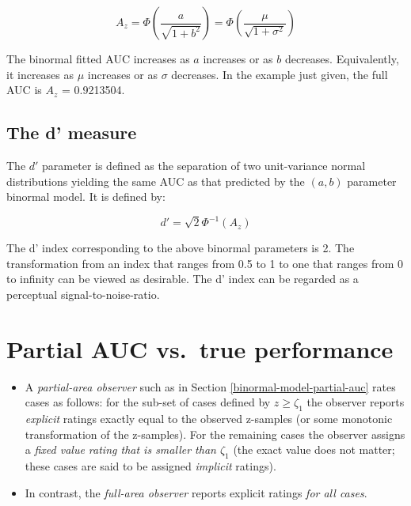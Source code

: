 \documentclass[
]{book}
\begin{document}
\begin{equation} 
A_z=\Phi\left ( \frac{a}{\sqrt{1+b^2}} \right )=\Phi\left ( \frac{\mu}{\sqrt{1+\sigma^2}} \right )
\label{eq:binormal-model-ab-2az}
\end{equation}

The binormal fitted AUC increases as \(a\) increases or as \(b\) decreases. Equivalently, it increases as \(\mu\) increases or as \(\sigma\) decreases. In the example just given, the full AUC is \(A_z\) = 0.9213504.

\hypertarget{binormal-model-d-prime}{%
\subsection{The d' measure}\label{binormal-model-d-prime}}

The \(d'\) parameter is defined as the separation of two unit-variance normal distributions yielding the same AUC as that predicted by the \((a,b)\) parameter binormal model. It is defined by:

\begin{equation} 
d'=\sqrt{2}\Phi^{-1}\left ( A_z \right )
\label{eq:binormal-model-ab-2dprime}
\end{equation}

The d' index corresponding to the above binormal parameters is 2. The transformation from an index that ranges from 0.5 to 1 to one that ranges from 0 to infinity can be viewed as desirable. The d' index can be regarded as a perceptual signal-to-noise-ratio.

\hypertarget{binormal-model-partial-true}{%
\section{Partial AUC vs.~true performance}\label{binormal-model-partial-true}}

\begin{itemize}
\item
  A \emph{partial-area observer} such as in Section \ref{binormal-model-partial-auc} rates cases as follows: for the sub-set of cases defined by \(z \ge \zeta_1\) the observer reports \emph{explicit} ratings exactly equal to the observed z-samples (or some monotonic transformation of the z-samples). For the remaining cases the observer assigns a \emph{fixed value rating that is smaller than \(\zeta_1\)} (the exact value does not matter; these cases are said to be assigned \emph{implicit} ratings).
\item
  In contrast, the \emph{full-area observer} reports explicit ratings \emph{for all cases}.
\end{itemize}
\end{document}
